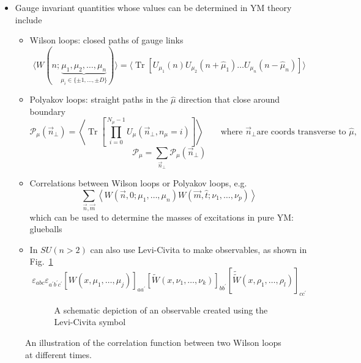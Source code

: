 \begin{itemize}
  \item Gauge invariant quantities whose values can be determined in YM theory include
  \begin{itemize}
      \item Wilson loops: closed paths of gauge links
      \begin{equation}
          \langle W (n; \underset{\mu_i \in \{ \pm1, \ldots, \pm D\}}{\underbrace{\mu_1, \mu_2, \ldots, \mu_n}})\rangle = \langle \operatorname{Tr}[U_{\mu_1}(n)U_{\mu_2}(n+\hat{\mu}_1)\ldots U_{\mu_n}(n - \hat{\mu}_n)] \rangle
      \end{equation}
      \item Polyakov loops: straight paths in the $\hat{\mu}$ direction that close around boundary
      \begin{equation}
          \mathcal{P}_\mu(\vec{n}_\perp) = \left\langle \operatorname{Tr} \left[ \prod_{i=0}^{N_\mu - 1} U_\mu(\vec{n}_\perp, n_\mu = i)\right] \right\rangle \qquad \text{where $\vec{n}_\perp$are coords transverse to $\hat{\mu}$},
      \end{equation}
      \begin{equation}
          \mathcal{P}_\mu = \sum_{\vec{n}_\perp} \mathcal{P}_\mu(\vec{n}_\perp)
      \end{equation}
      \item Correlations between Wilson loops or Polyakov loops, e.g.
      \begin{equation}
    \sum_{\vec{n}, \vec{m}}\left\langle W\left(\vec{n}, 0 ; \mu_{1}, \ldots, \mu_{n}\right) W\left(\vec{m}, \hat{t}; \nu_{1}, \ldots, \nu_{p}\right)\right\rangle
    \end{equation}
    which can be used to determine the masses of excitations in pure YM: glueballs
    \item In $SU(n > 2)$ can also use Levi-Civita to make observables, as shown in Fig.~\ref{fig:lc_observables}
    \begin{equation}
    \varepsilon_{a b c} \varepsilon_{a^\prime b^\prime c^\prime}\left[W\left(x, \mu_{1}, \ldots, \mu_{j}\right)\right]_{a a^{\prime}}\left[\tilde{W}\left(x, \nu_{1}, \ldots, \nu_{k}\right)\right]_{b b^{\prime}}\left[\tilde{\tilde{W}}\left(x, \rho_{1}, \ldots ,\rho_{l}\right)\right]_{c c^{\prime}}
    \end{equation}
    \begin{figure}
        \centering
        \caption{A schematic depiction of an observable created using the Levi-Civita symbol}
        \label{fig:lc_observables}
    \end{figure}
  \end{itemize}
\end{itemize}
\begin{figure}
\caption{An illustration of the correlation function between two Wilson loops at different times.}
\end{figure}



